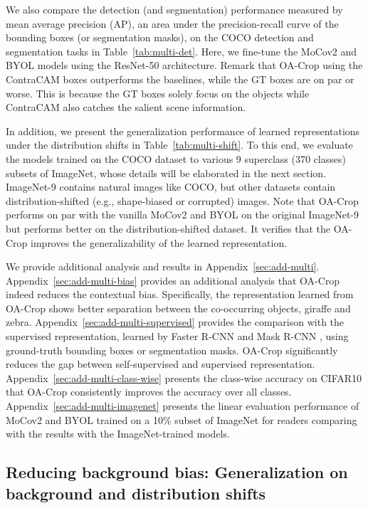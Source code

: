 \documentclass{article}
\begin{document}
We also compare the detection (and segmentation) performance measured by mean average precision (AP), an area under the precision-recall curve of the bounding boxes (or segmentation masks), on the COCO detection and segmentation tasks in Table~\ref{tab:multi-det}. Here, we fine-tune the MoCov2 and BYOL models using the ResNet-50 architecture. Remark that OA-Crop using the ContraCAM boxes outperforms the baselines, while the GT boxes are on par or worse. This is because the GT boxes solely focus on the objects while ContraCAM also catches the salient scene information.

In addition, we present the generalization performance of learned representations under the distribution shifts in Table~\ref{tab:multi-shift}. To this end, we evaluate the models trained on the COCO dataset to various 9 superclass (370 classes) subsets of ImageNet, whose details will be elaborated in the next section. ImageNet-9 contains natural images like COCO, but other datasets contain distribution-shifted (e.g., shape-biased or corrupted) images. Note that OA-Crop performs on par with the vanilla MoCov2 and BYOL on the original ImageNet-9 but performs better on the distribution-shifted dataset. It verifies that the OA-Crop improves the generalizability of the learned representation.

We provide additional analysis and results in Appendix~\ref{sec:add-multi}. Appendix~\ref{sec:add-multi-bias} provides an additional analysis that OA-Crop indeed reduces the contextual bias. Specifically, the representation learned from OA-Crop shows better separation between the co-occurring objects, giraffe and zebra. Appendix~\ref{sec:add-multi-supervised} provides the comparison with the supervised representation, learned by Faster R-CNN \citep{ren2015faster} and Mask R-CNN \citep{he2017mask}, using ground-truth bounding boxes or segmentation masks. OA-Crop significantly reduces the gap between self-supervised and supervised representation. Appendix~\ref{sec:add-multi-class-wise} presents the class-wise accuracy on CIFAR10 that OA-Crop consistently improves the accuracy over all classes. Appendix~\ref{sec:add-multi-imagenet} presents the linear evaluation performance of MoCov2 and BYOL trained on a 10\% subset of ImageNet for readers comparing with the results with the ImageNet-trained models.


\subsection{Reducing background bias: Generalization on background and distribution shifts}
\label{sec:exp-bg}
\end{document}
